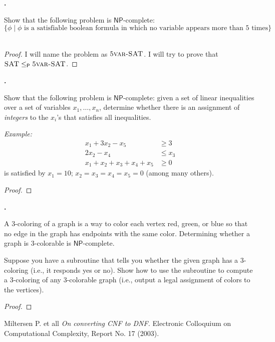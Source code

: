 \documentclass[letterpaper,11pt]{article}
\newcommand{\cc}[1]{\ensuremath{\textsf{#1}}\xspace}
\newcommand{\NP}{\cc{NP}}
\newcommand{\karp}{\le_{\textsf{P}}}
\newcounter{problem}
\newenvironment{problem}%
{%
	\stepcounter{problem}%
	\textbf{\theproblem.}
	\large
}{\\}%
\begin{document}
\begin{problem}
Show that the following problem is \NP-complete:
\[
    \{ \phi \mid \phi \mbox{ is a satisfiable boolean formula in which no variable appears more than 5 times}\}
\]
\end{problem}

\begin{proof}
I will name the problem as $\textsc{5var-SAT}$.
I will try to prove that $\textsc{SAT} \karp \textsc{5var-SAT}$.
\end{proof}

\begin{problem}
Show that the following problem is \NP-complete: given a set of linear inequalities over a set of variables $x_1, \ldots, x_n$, determine whether there is an assignment of {\em integers} to the $x_i$'s that satisfies all inequalities.

{\em Example:}
\begin{align*}
    x_1 + 3x_2 - x_5 &\ge 3 \\
    2x_2 - x_4 &\le x_3 \\
    x_1 + x_2 + x_3 + x_4 + x_5 &\ge 0
\end{align*}
is satisfied by $x_1 = 10$; $x_2 = x_3 = x_4 = x_5 = 0$ (among many others).
\end{problem}

\begin{proof}
\end{proof}

\begin{problem}
A 3-coloring of a graph is a way to color each vertex red, green, or blue so that no edge in the graph has endpoints with the same color. Determining whether a graph is 3-colorable is \NP-complete.

Suppose you have a subroutine that tells you whether the given graph has a 3-coloring (i.e., it responds {\sc yes} or {\sc no}). Show how to use the subroutine to compute a 3-coloring of any 3-colorable graph (i.e., output a legal assignment of colors to the vertices).
\end{problem}

\begin{proof}
\end{proof}

\begin{thebibliography}{1}

 Miltersen P. et all {\em On converting CNF to DNF.} Electronic Colloquium on Computational Complexity, Report No. 17 (2003).

\end{thebibliography}
\end{document}
